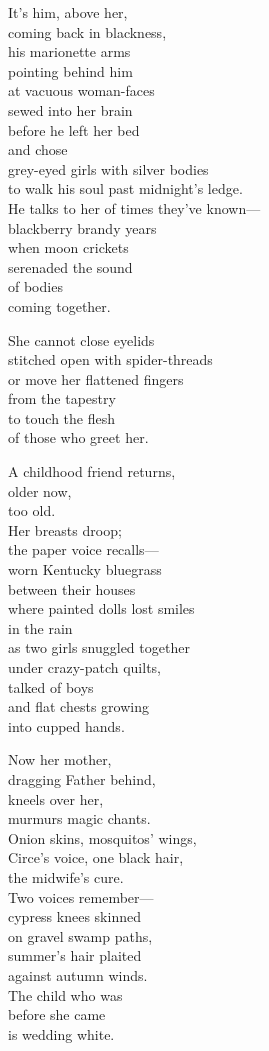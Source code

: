 \documentclass[twoside,10pt]{book}
\begin{document}
It's him, above her,\\
coming back in blackness,\\
his marionette arms\\
pointing behind him\\
at vacuous woman-faces\\
sewed into her brain\\
before he left her bed\\
and chose\\
grey-eyed girls with silver bodies\\
to walk his soul past midnight's ledge.\\
He talks to her of times they've known---\\
blackberry brandy years\\
when moon crickets\\
serenaded the sound\\
of bodies\\
coming together.

She cannot close eyelids\\
stitched open with spider-threads\\
or move her flattened fingers\\
from the tapestry\\
to touch the flesh\\
of those who greet her.

A childhood friend returns,\\
older now,\\
too old.\\
Her breasts droop;\\
the paper voice recalls---\\
worn Kentucky bluegrass\\
between their houses\\
where painted dolls lost smiles\\
in the rain\\
as two girls snuggled together\\
under crazy-patch quilts,\\
talked of boys\\
and flat chests growing\\
into cupped hands.

Now her mother,\\
dragging Father behind,\\
kneels over her,\\
murmurs magic chants.\\
Onion skins, mosquitos' wings,\\
Circe's voice, one black hair,\\
the midwife's cure.\\
Two voices remember---\\
cypress knees skinned\\
on gravel swamp paths,\\
summer's hair plaited\\
against autumn winds.\\
The child who was\\
before she came\\
is wedding white.
\end{document}
